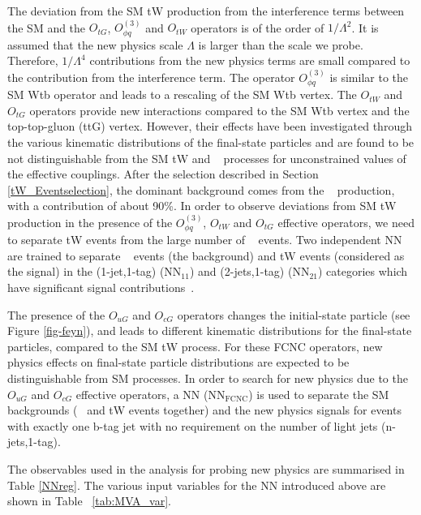 The deviation from the SM tW production from the interference terms between the
SM and the $O_{tG}$, $O_{\phi q}^{(3)}$ and $O_{tW}$ operators is of the order of $1/\Lambda^2$.
It is assumed that the new physics scale $\Lambda$ is larger than the scale we probe. Therefore, $1/\Lambda^4$
contributions from the new physics terms are small compared to the contribution from the interference term.
The operator $O_{\phi q}^{(3)}$ is similar to the SM Wtb operator and leads to a rescaling of the SM Wtb vertex.
The $O_{tW}$ and $O_{tG}$ operators provide new interactions compared to the SM Wtb vertex and the top-top-gluon (ttG) vertex.
However, their effects have been investigated through the various kinematic distributions of the final-state particles and are found to be not distinguishable from the SM tW and \ttbar~ processes for unconstrained values of the effective couplings.
After the selection described in Section \ref{tW_Eventselection}, the dominant background comes from the \ttbar~ production, with a contribution of about 90\%.
In order to observe deviations from SM tW production in the presence of the $O_{\phi q}^{(3)}$, $O_{tW}$ and $O_{tG}$ effective operators, we need to separate tW events from the large number of \ttbar~ events.
 Two independent NN are trained to separate \ttbar~ events (the background) and tW events (considered as the signal) in the (1-jet,1-tag) (NN$_{11}$) and (2-jets,1-tag) (NN$_{21}$) categories which have significant signal contributions~\cite{Sirunyan:2018lcp}.



The presence of the $O_{uG}$ and $O_{cG}$ operators changes the initial-state particle (see Figure \ref{fig-feyn}), and leads to different kinematic distributions for the final-state particles, compared to the SM tW process.
For these FCNC operators, new physics effects on final-state particle distributions are expected to be distinguishable from SM processes.
In order to search for new physics due to the $O_{uG}$ and $O_{cG}$ effective operators, a NN (NN$_{\text{FCNC}}$) is used to separate the SM backgrounds (\ttbar~ and tW events together) and the new physics signals for events with exactly one b-tag jet with no requirement on the number of light jets (n-jets,1-tag).

The observables used in the analysis for probing new physics are summarised in Table \ref{NNreg}.
The various input variables for the NN introduced above are shown in Table ~\ref{tab:MVA_var}.



